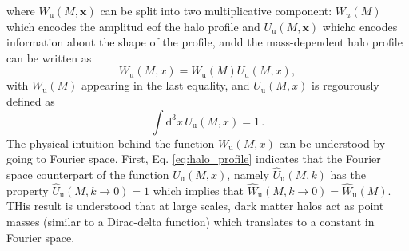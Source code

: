 where $W_\mathrm{u}(M, \mathbf{x})$ can be split into two multiplicative component: $W_u (M)$ which encodes the amplitud eof the halo profile and $U_\mathrm{u}(M, \mathbf{x})$ whichc encodes information about the shape of the profile, andd the mass-dependent halo profile can be written as
\begin{equation}
W_{\mathrm{u}}(M, x) = W_{\mathrm{u}}(M) U_{\mathrm{u}}(M, x),
\end{equation}
with $W_{\mathrm{u}}(M)$ appearing in the last equality, and $U_{\mathrm{u}}(M, x)$ is regourously defined as 
\begin{equation} \label{eq:halo_profile}
    \int \mathrm{d}^3x \, U_{\mathrm{u}}(M, x) = 1 \, .
\end{equation}
The physical intuition behind the function $W_{\mathrm{u}}(M, x)$ can be understood by going to Fourier space. First, Eq. \ref{eq:halo_profile} indicates that the Fourier space counterpart of the function $U_{\mathrm{u}}(M, x)$, namely $\hat{U}_{\mathrm{u}}(M, k)$ has the property $\hat{U}_{\mathrm{u}}(M, k \to 0) = 1$ which implies that $\hat{W}_{\mathrm{u}}(M, k \to 0) = \hat{W}_{\mathrm{u}}(M)$. THis result is understood that at large scales, dark matter halos act as point masses (similar to a Dirac-delta function) which translates to a constant in Fourier space.

